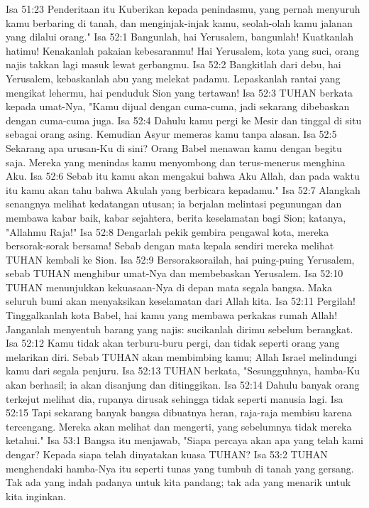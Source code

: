 Isa 51:23  Penderitaan itu Kuberikan kepada penindasmu, yang pernah menyuruh kamu berbaring di tanah, dan menginjak-injak kamu, seolah-olah kamu jalanan yang dilalui orang."
Isa 52:1  Bangunlah, hai Yerusalem, bangunlah! Kuatkanlah hatimu! Kenakanlah pakaian kebesaranmu! Hai Yerusalem, kota yang suci, orang najis takkan lagi masuk lewat gerbangmu.
Isa 52:2  Bangkitlah dari debu, hai Yerusalem, kebaskanlah abu yang melekat padamu. Lepaskanlah rantai yang mengikat lehermu, hai penduduk Sion yang tertawan!
Isa 52:3  TUHAN berkata kepada umat-Nya, "Kamu dijual dengan cuma-cuma, jadi sekarang dibebaskan dengan cuma-cuma juga.
Isa 52:4  Dahulu kamu pergi ke Mesir dan tinggal di situ sebagai orang asing. Kemudian Asyur memeras kamu tanpa alasan.
Isa 52:5  Sekarang apa urusan-Ku di sini? Orang Babel menawan kamu dengan begitu saja. Mereka yang menindas kamu menyombong dan terus-menerus menghina Aku.
Isa 52:6  Sebab itu kamu akan mengakui bahwa Aku Allah, dan pada waktu itu kamu akan tahu bahwa Akulah yang berbicara kepadamu."
Isa 52:7  Alangkah senangnya melihat kedatangan utusan; ia berjalan melintasi pegunungan dan membawa kabar baik, kabar sejahtera, berita keselamatan bagi Sion; katanya, "Allahmu Raja!"
Isa 52:8  Dengarlah pekik gembira pengawal kota, mereka bersorak-sorak bersama! Sebab dengan mata kepala sendiri mereka melihat TUHAN kembali ke Sion.
Isa 52:9  Bersoraksorailah, hai puing-puing Yerusalem, sebab TUHAN menghibur umat-Nya dan membebaskan Yerusalem.
Isa 52:10  TUHAN menunjukkan kekuasaan-Nya di depan mata segala bangsa. Maka seluruh bumi akan menyaksikan keselamatan dari Allah kita.
Isa 52:11  Pergilah! Tinggalkanlah kota Babel, hai kamu yang membawa perkakas rumah Allah! Janganlah menyentuh barang yang najis: sucikanlah dirimu sebelum berangkat.
Isa 52:12  Kamu tidak akan terburu-buru pergi, dan tidak seperti orang yang melarikan diri. Sebab TUHAN akan membimbing kamu; Allah Israel melindungi kamu dari segala penjuru.
Isa 52:13  TUHAN berkata, "Sesungguhnya, hamba-Ku akan berhasil; ia akan disanjung dan ditinggikan.
Isa 52:14  Dahulu banyak orang terkejut melihat dia, rupanya dirusak sehingga tidak seperti manusia lagi.
Isa 52:15  Tapi sekarang banyak bangsa dibuatnya heran, raja-raja membisu karena tercengang. Mereka akan melihat dan mengerti, yang sebelumnya tidak mereka ketahui."
Isa 53:1  Bangsa itu menjawab, "Siapa percaya akan apa yang telah kami dengar? Kepada siapa telah dinyatakan kuasa TUHAN?
Isa 53:2  TUHAN menghendaki hamba-Nya itu seperti tunas yang tumbuh di tanah yang gersang. Tak ada yang indah padanya untuk kita pandang; tak ada yang menarik untuk kita inginkan.
